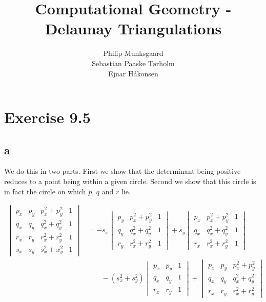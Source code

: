 \documentclass[11pt,a4paper]{article}
\title{Computational Geometry - Delaunay Triangulations}
\author{Philip Munksgaard \\ Sebastian Paaske Tørholm \\ Ejnar Håkonsen}
\begin{document}
\maketitle

\section{Exercise 9.5}
\subsection{a}
We do this in two parts. First we show that the determinant being positive
reduces to a point being within a given circle. Second we show that this
circle is in fact the circle on which $p$, $q$ and $r$ lie.

\begin{align}
    \begin{vmatrix} p_x & p_y & p_x^2+p_y^2 & 1 \\
                    q_x & q_y & q_x^2+q_y^2 & 1 \\
                    r_x & r_y & r_x^2+r_y^2 & 1 \\
                    s_x & s_y & s_x^2+x_y^2 & 1 \end{vmatrix}
    &= - s_x \begin{vmatrix} p_y & p_x^2+p_y^2 & 1 \\
                             q_y & q_x^2+q_y^2 & 1 \\
                             r_y & r_x^2+r_y^2 & 1 \end{vmatrix}
       + s_y \begin{vmatrix} p_x & p_x^2+p_y^2 & 1 \\
                             q_x & q_x^2+q_y^2 & 1 \\
                             r_x & r_x^2+r_y^2 & 1 \end{vmatrix}\\
    & \quad\quad  - (s_x^2+s_y^2) \begin{vmatrix} p_x & p_y & 1 \\
                                       q_x & q_y & 1 \\
                                       r_x & r_y & 1 \end{vmatrix}
       + \begin{vmatrix} p_x & p_y & p_x^2+p_y^2 \\
                         q_x & q_y & q_x^2+q_y^2 \\
                         r_x & r_y & r_x^2+r_y^2 \end{vmatrix} \\

\end{align}
\end{document}

